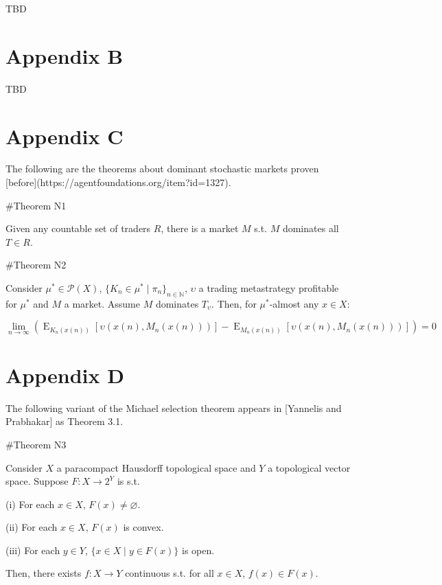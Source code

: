 \documentclass[a4paper]{article}
\newcommand{\Comment}[1]{}
\DeclareMathOperator{\E}{E}
\newcommand{\Nats}{\mathbb{N}}
\newcommand{\Prob}{\mathcal{P}}
\begin{document}
TBD

\section{Appendix B}

TBD

\section{Appendix C}

The following are the theorems about dominant stochastic markets proven [before](https://agentfoundations.org/item?id=1327).

\#Theorem N1

Given any countable set of traders $R$, there is a market ${M}$ s.t. ${M}$ dominates all ${T \in R}$.

\#Theorem N2

Consider ${\mu^* \in \Prob(X)}$, ${\{K_n \in \mu^* \mid \pi_{n}\}_{n \in \Nats}}$, ${\upsilon}$ a trading metastrategy profitable for ${\mu^*}$ and ${M}$ a market. Assume ${M}$ dominates ${T_\upsilon}$. Then, for ${\mu^*}$-almost any ${x \in X}$:

$$\lim_{n \rightarrow \infty} (\E_{K_n(x(n))}[\upsilon(x(n),M_n(x(n)))]-\E_{M_n(x(n))}[\upsilon(x(n),M_n(x(n)))])= 0$$

\section{Appendix D}

The following variant of the Michael selection theorem appears in [Yannelis and Prabhakar]\Comment{(https://www.biz.uiowa.edu/faculty/nyannelis/publications/Existence_of_Maximal_Elements_and_Equilibria_in_Linear_Topological_Spaces.pdf)} as Theorem 3.1.

\#Theorem N3

Consider $X$ a paracompact Hausdorff topological space and $Y$ a topological vector space. Suppose $F: X \rightarrow 2^Y$ is s.t.

(i) For each $x \in X$, $F(x) \ne \varnothing$.

(ii) For each $x \in X$, $F(x)$ is convex.

(iii) For each $y \in Y$, $\{x \in X \mid y \in F(x)\}$ is open.

Then, there exists $f: X \rightarrow Y$ continuous s.t. for all $x \in X$, $f(x) \in F(x)$.
\end{document}
